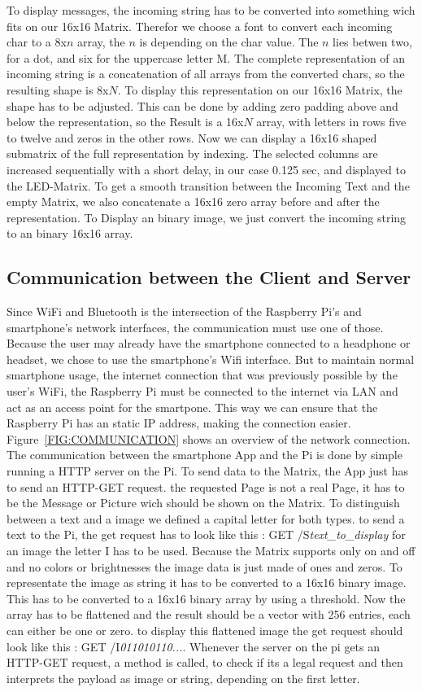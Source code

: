 \documentclass[conference]{IEEEtran}
\begin{document}
To display messages, the incoming string has to be converted into something wich fits on our 16x16 Matrix. Therefor we choose a font to convert each incoming char to a 8x$n$ array, the $n$ is depending on the char value. The $n$ lies betwen two, for a dot, and six for the uppercase letter M. The complete representation of an incoming string is a concatenation of all arrays from the converted chars, so the resulting shape is 8x$N$. To display this representation on our 16x16 Matrix, the shape has to be adjusted. This can be done by adding zero padding above and below the representation, so the Result is a 16x$N$ array, with letters in rows five to twelve and zeros in the other rows. Now we can display a 16x16 shaped submatrix of the full representation by indexing. The selected columns are increased sequentially with a short delay, in our case 0.125 sec, and displayed to the LED-Matrix. To get a smooth transition between the Incoming Text and the empty Matrix, we also concatenate a 16x16 zero array before and after the representation.
To Display an binary image, we just convert the incoming string to an binary 16x16 array.

\subsection{Communication between the Client and Server}
Since WiFi and Bluetooth is the intersection of the Raspberry Pi's and smartphone's network interfaces, the communication must use one of those. Because the user may already have the smartphone connected to a headphone or headset, we chose to use the smartphone's Wifi interface. But to maintain normal smartphone usage, the internet connection that was previously possible by the user's WiFi, the Raspberry Pi must be connected to the internet via LAN and act as an access point for the smartpone. This way we can ensure that the Raspberry Pi has an static IP address, making the connection easier. Figure~\ref{FIG:COMMUNICATION} shows an overview of the network connection. The communication between the smartphone App and the Pi is done by simple running a HTTP server on the Pi. To send data to the Matrix, the App just has to send an HTTP-GET request. the requested Page is not a real Page, it has to be the Message or Picture wich should be shown on the Matrix. To distinguish between a text and a image we defined a capital letter for both types. to send a text to the Pi, the get request has to look like this : GET /S\textit{text_to_display} for an image the letter I has to be used. Because the Matrix supports only on and off and no colors or brightnesses the image data is just made of ones and zeros. To representate the image as string it has to be converted to a 16x16 binary image. This has to be converted to a 16x16 binary array by using a threshold. Now the array has to be flattened and the result should be a vector with 256 entries, each can either be one or zero. to display this flattened image the get request should look like this : GET /I\textit{011010110...}. Whenever the server on the pi gets an HTTP-GET request, a method is called, to check if its a legal request and then interprets the payload as image or string, depending on the first letter.
\end{document}
